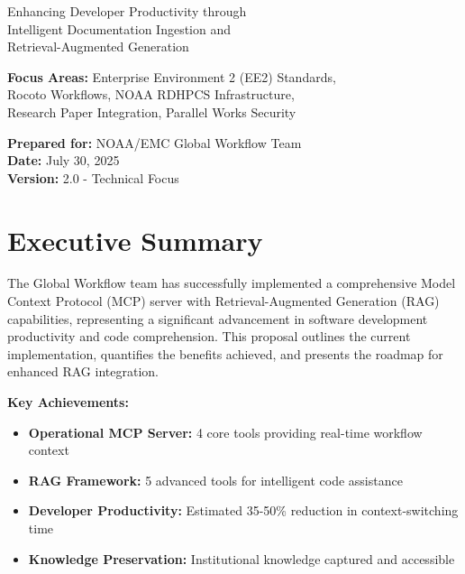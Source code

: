 \documentclass[11pt,letterpaper]{article}
\begin{document}
\begin{titlepage}
\begin{center}
\vspace{2cm}
\color{black}
\fontsize{18}{22}\selectfont
Enhancing Developer Productivity through \\
Intelligent Documentation Ingestion and \\
Retrieval-Augmented Generation

\vspace{1.5cm}
\fontsize{16}{20}\selectfont
\textbf{Focus Areas:} Enterprise Environment 2 (EE2) Standards, \\
Rocoto Workflows, NOAA RDHPCS Infrastructure, \\
Research Paper Integration, Parallel Works Security

\vspace{1.5cm}
\fontsize{14}{18}\selectfont
\textbf{Prepared for:} NOAA/EMC Global Workflow Team \\
\textbf{Date:} July 30, 2025 \\
\textbf{Version:} 2.0 - Technical Focus

\vspace{1cm}
\end{center}
\end{titlepage}

\newpage

\section*{Executive Summary}
\begin{executivebox}
The Global Workflow team has successfully implemented a comprehensive Model Context Protocol (MCP) server with Retrieval-Augmented Generation (RAG) capabilities, representing a significant advancement in software development productivity and code comprehension. This proposal outlines the current implementation, quantifies the benefits achieved, and presents the roadmap for enhanced RAG integration.

\textbf{Key Achievements:}
\begin{itemize}[leftmargin=20pt]
    \item \textbf{Operational MCP Server:} 4 core tools providing real-time workflow context
    \item \textbf{RAG Framework:} 5 advanced tools for intelligent code assistance
    \item \textbf{Developer Productivity:} Estimated 35-50\% reduction in context-switching time
    \item \textbf{Knowledge Preservation:} Institutional knowledge captured and accessible
\end{itemize}
\end{executivebox}
\end{document}
